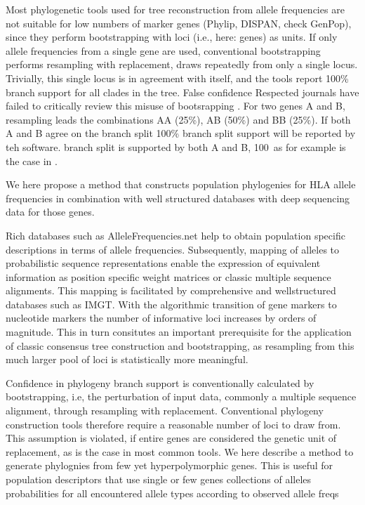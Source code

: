 \documentclass{article}
\begin{document}
Most phylogenetic tools used for tree reconstruction from allele frequencies are not suitable for low numbers of marker
genes (Phylip, DISPAN, check GenPop), since they perform bootstrapping with loci (i.e., here: genes) as units.
If only allele frequencies from a single gene are used, conventional bootstrapping performs resampling with replacement,
draws repeatedly from only a single locus. Trivially, this single locus is in agreement with itself, and the tools
report 100\% branch support for all clades in the tree.
False confidence
Respected journals have failed to critically review this misuse of bootsrapping \cite{ArnaizVillena2017Jan,Hajjej2018Mar}.
For two genes A and B, resampling leads the combinations AA (25\%), AB (50\%) and BB (25\%). If both A and B agree on the branch split
100\% branch split support will be reported by teh software. branch split is
supported by both A and B, 100\
as for example is the case in \cite{Hajjej2018Mar}.


We here propose a method that constructs population phylogenies for HLA allele frequencies in combination with well structured databases
with deep sequencing data for those genes.

Rich databases such as AlleleFrequencies.net help to obtain population specific descriptions in terms of allele
frequencies. Subsequently, mapping of alleles to probabilistic sequence representations enable
the expression of equivalent information as position specific weight matrices or classic multiple sequence alignments.
 This mapping is facilitated by comprehensive and wellstructured databases such as IMGT.
With the algorithmic transition of gene markers to nucleotide markers
the number of informative loci increases by orders of magnitude.
This in turn consitutes an important prerequisite for the application of classic consensus tree construction and
bootstrapping, as resampling from this much larger pool of loci is
statistically more meaningful.


Confidence in phylogeny branch support is conventionally calculated by bootstrapping, i.e, the perturbation of input data, commonly a multiple sequence alignment, through resampling with replacement. Conventional phylogeny construction tools therefore require a reasonable number of loci to draw from. This assumption is violated, if entire genes are considered the genetic unit of replacement, as is the case in most common tools.
    We here describe a method to generate phylognies from few yet hyperpolymorphic genes. 
    This is useful for population descriptors that use single or few genes collections of alleles
    probabilities for all encountered allele types according 
    to observed allele freqs
\end{document}
